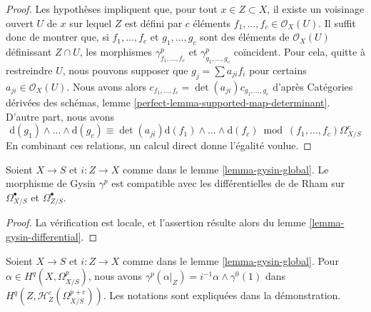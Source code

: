 \begin{proof}
Les hypothèses impliquent que, pour tout $x \in Z \subset X$, il existe un
voisinage ouvert $U$ de $x$ sur lequel $Z$ est défini par $c$
éléments $f_1, \ldots, f_c \in \mathcal{O}_X(U)$. Il suffit donc de montrer que, si $f_1, \ldots, f_c$ et
$g_1, \ldots, g_c$ sont des éléments de $\mathcal{O}_X(U)$ définissant $Z \cap U$,
les morphismes $\gamma^p_{f_1, \ldots, f_c}$
et $\gamma^p_{g_1, \ldots, g_c}$ coïncident. Pour cela, quitte à restreindre
$U$, nous pouvons supposer que $g_j = \sum a_{ji} f_i$ pour certains
$a_{ji} \in \mathcal{O}_X(U)$. Nous avons alors
$c_{f_1, \ldots, f_c} = \det(a_{ji}) c_{g_1, \ldots, g_c}$ d'après
Catégories dérivées des schémas, lemme
\ref{perfect-lemma-supported-map-determinant}.
D'autre part, nous avons
$$
\text{d}(g_1) \wedge \ldots \wedge \text{d}(g_c) \equiv
\det(a_{ji}) \text{d}(f_1) \wedge \ldots \wedge \text{d}(f_c)
\bmod (f_1, \ldots, f_c)\Omega^c_{X/S}
$$
En combinant ces relations, un calcul direct donne
l'égalité voulue.
\end{proof}

\begin{lemma}
\label{lemma-gysin-differential-global}
Soient $X \to S$ et $i : Z \to X$ comme dans le lemme \ref{lemma-gysin-global}.
Le morphisme de Gysin $\gamma^p$ est compatible avec les différentielles de de Rham
sur $\Omega^\bullet_{X/S}$ et $\Omega^\bullet_{Z/S}$.
\end{lemma}

\begin{proof}
La vérification est locale, et l'assertion résulte alors du
lemme \ref{lemma-gysin-differential}.
\end{proof}

\begin{lemma}
\label{lemma-gysin-projection}
Soient $X \to S$ et $i : Z \to X$ comme dans le lemme \ref{lemma-gysin-global}.
Pour $\alpha \in H^q(X, \Omega^p_{X/S})$, nous avons
$\gamma^p(\alpha|_Z) = i^{-1}\alpha \wedge \gamma^0(1)$ dans
$H^q(Z, \mathcal{H}^c_Z(\Omega^{p + c}_{X/S}))$.
Les notations sont expliquées dans la démonstration.
\end{lemma}

